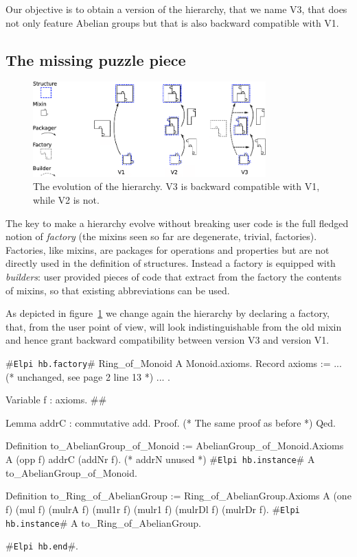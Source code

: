 \documentclass[a4paper,UKenglish,cleveref, autoref]{lipics-v2019}
\newcommand{\mixin}{mixin}
\newcommand{\mixins}{mixins}
\newcommand{\factory}{factory}
\newcommand{\factories}{factories}
\newcommand{\Factories}{Factories}
\newcommand{\phantterm}{abbreviation}
\newcommand{\builder}{builder}
\newcommand{\hbfactory}{{\tt\color{dkgreen}Elpi hb.factory}}
\newcommand{\hbinstance}{{\tt\color{dkgreen}Elpi hb.instance}}
\newcommand{\hbend}{{\tt\color{dkgreen}Elpi hb.end}}
\theoremstyle{implem}
\theoremstyle{implem}
\theoremstyle{command}
\begin{document}
Our objective is to obtain a version of the hierarchy, that we name V3, that does
not only feature Abelian groups but that is also backward compatible
with V1.

\subsection{The missing puzzle piece}\label{subsec:v3}

\begin{figure}[!h]
  \begin{center}
    \includegraphics[width=0.8\textwidth]{puzzle.pdf}
  \end{center}
  \caption{\label{fig:puzzle}The evolution of the hierarchy. V3 is backward compatible with V1, while V2 is not.}
\end{figure}

The key to make a hierarchy evolve without breaking user code is the full
fledged notion of \emph{\factory{}} (the \mixins{} seen so far are degenerate,
trivial, \factories{}).
\Factories{}, like \mixins{}, are packages for operations and properties but are
not directly used in the definition of structures. Instead a \factory{} is
equipped with \emph{\builder{}s}: user provided pieces of code that extract
from the \factory{} the contents of \mixins{}, so that existing
\phantterm{}s can be used.

As depicted in figure~\ref{fig:puzzle} we change again the hierarchy
by declaring a  \factory{}, that, from the user point of view,
will look indistinguishable from the old  \mixin{}
and hence grant backward compatibility between version V3 and version V1.

\begin{coqcode}
#\hbfactory{}# Ring_of_Monoid A Monoid.axioms.
  Record axioms := { ... (* unchanged, see page 2 line 13 *) ... }.

  Variable f : axioms.                                                          #\label{demo3:variable:f}#

  Lemma addrC : commutative add. Proof. (* The same proof as before *) Qed.

  Definition to_AbelianGroup_of_Monoid :=
    AbelianGroup_of_Monoid.Axioms A (opp f) addrC (addNr f). (* addrN unused *)
  #\hbinstance{}# A to_AbelianGroup_of_Monoid.

  Definition to_Ring_of_AbelianGroup :=
    Ring_of_AbelianGroup.Axioms A (one f) (mul f)
      (mulrA f) (mul1r f) (mulr1 f) (mulrDl f) (mulrDr f).
  #\hbinstance{}# A to_Ring_of_AbelianGroup.

#\hbend{}#.
\end{coqcode}
\end{document}
